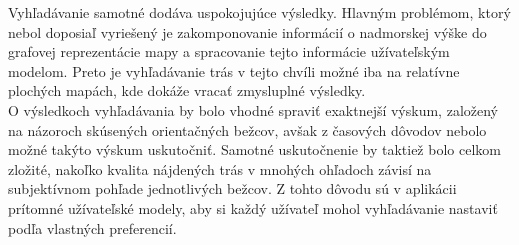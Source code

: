 Vyhľadávanie samotné dodáva uspokojujúce výsledky. Hlavným problémom, ktorý nebol doposiaľ vyriešený je zakomponovanie informácií o nadmorskej výške do grafovej reprezentácie mapy a spracovanie tejto informácie užívateľským modelom. Preto je vyhľadávanie trás v tejto chvíli možné iba na relatívne plochých mapách, kde dokáže vracať zmysluplné výsledky.\\ 
O výsledkoch vyhľadávania by bolo vhodné spraviť exaktnejší výskum, založený na názoroch skúsených orientačných bežcov, avšak z časových dôvodov nebolo možné takýto výskum uskutočniť. Samotné uskutočnenie by taktiež bolo celkom zložité, nakoľko kvalita nájdených trás v mnohých ohľadoch závisí na subjektívnom pohľade jednotlivých bežcov. Z tohto dôvodu sú v aplikácii prítomné užívateľské modely, aby si každý užívateľ mohol vyhľadávanie nastaviť podľa vlastných preferencií.
